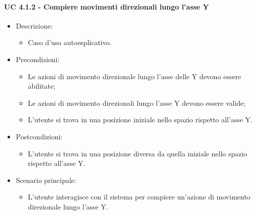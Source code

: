 \paragraph{UC 4.1.2 - Compiere movimenti direzionali lungo l'asse Y}
\begin{itemize}

	\item Descrizione:
	\begin{itemize}
		\item Caso d'uso autoesplicativo.
	\end{itemize}
	
	\item Precondizioni:
	\begin{itemize}
		\item Le azioni di movimento direzionale lungo l'asse delle Y devono essere abilitate;
		\item Le azioni di movimento direzionali lungo l'asse Y devono essere valide;
		\item L'utente si trova in una posizione iniziale nello spazio rispetto all'asse Y.
	\end{itemize}
	
	\item Postcondizioni:
	\begin{itemize}
		\item L'utente si trova in una posizione diversa da quella iniziale nello spazio rispetto all'asse Y.
	\end{itemize}
	
	\item Scenario principale:
	\begin{itemize}
		\item L'utente interagisce con il sistema per compiere un'azione di movimento direzionale lungo l'asse Y.
	\end{itemize}
	
\end{itemize}


